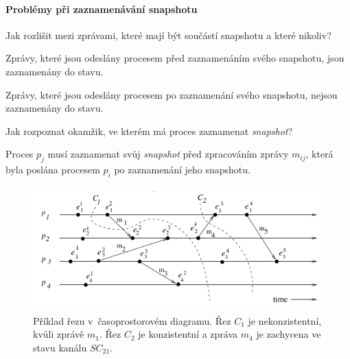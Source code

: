 \paragraph*{Problémy při zaznamenávání snapshotu} Jak rozlišit mezi zprávami, které mají být součástí snapshotu a které nikoliv?
\begin{compactitem}
    \item Zprávy, které jsou odeslány procesem před zaznamenáním svého  snapshotu, jsou zaznamenány do stavu.
    \item Zprávy, které jsou odeslány procesem po zaznamenání svého  snapshotu, nejsou zaznamenány do stavu.
\end{compactitem}

\noindent Jak rozpoznat okamžik, ve kterém má proces zaznamenat \textit{snapshot}?
\begin{compactitem}
    \item Proces $p_j$ musí zaznamenat svůj \textit{snapshot} před zpracováním zprávy $m_{ij}$, která byla poslána procesem $p_i$ po zaznamenání jeho snapshotu.
\end{compactitem}

\begin{figure}[H]
    \centering
    \includegraphics[width=1\linewidth]{example_cut.pdf}
    \caption{Příklad řezu v~časoprostorovém diagramu. Řez $C_1$ je nekonzistentní, kvůli zprávě $m_1$. Řez $C_2$ je konzistentní a zpráva $m_4$ je zachycena ve stavu kanálu $SC_{21}$.}
    \label{48_example_cut}
\end{figure}

